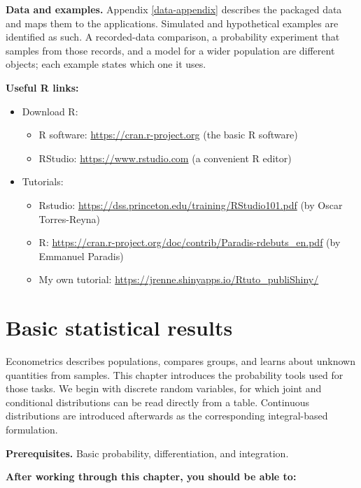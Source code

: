 \documentclass[
  11pt,
]{book}
\providecommand{\tightlist}{%
  \setlength{\itemsep}{0pt}\setlength{\parskip}{0pt}}
\theoremstyle{definition}
\theoremstyle{definition}
\theoremstyle{definition}
\theoremstyle{definition}
\theoremstyle{remark}
\begin{document}
\textbf{Data and examples.} Appendix \ref{data-appendix} describes the packaged data and maps them to the applications. Simulated and hypothetical examples are identified as such. A recorded-data comparison, a probability experiment that samples from those records, and a model for a wider population are different objects; each example states which one it uses.

\textbf{Useful R links:}

\begin{itemize}
\item
  Download R:

  \begin{itemize}
  \tightlist
  \item
    R software: \url{https://cran.r-project.org} (the basic R software)
  \item
    RStudio: \url{https://www.rstudio.com} (a convenient R editor)
  \end{itemize}
\item
  Tutorials:

  \begin{itemize}
  \tightlist
  \item
    Rstudio: \url{https://dss.princeton.edu/training/RStudio101.pdf} (by Oscar Torres-Reyna)
  \item
    R: \url{https://cran.r-project.org/doc/contrib/Paradis-rdebuts_en.pdf} (by Emmanuel Paradis)
  \item
    My own tutorial: \url{https://jrenne.shinyapps.io/Rtuto_publiShiny/}
  \end{itemize}
\end{itemize}

\chapter{Basic statistical results}\label{Basics}

Econometrics describes populations, compares groups, and learns about unknown quantities from samples. This chapter introduces the probability tools used for those tasks. We begin with discrete random variables, for which joint and conditional distributions can be read directly from a table. Continuous distributions are introduced afterwards as the corresponding integral-based formulation.

\textbf{Prerequisites.} Basic probability, differentiation, and integration.

\textbf{After working through this chapter, you should be able to:}
\end{document}
